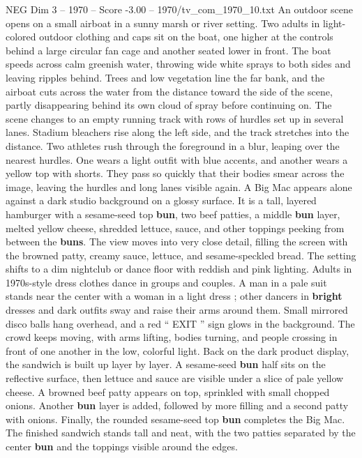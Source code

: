 \begin{textsample}{NEG Dim 3 – 1970 – Score -3.00 – 1970/tv\_com\_1970\_10.txt}  \label{ex:f3_neg_062}
An outdoor scene opens on a small airboat in a sunny marsh or river setting.
Two adults in light-colored outdoor clothing and caps sit on the boat, one higher at the controls behind a large circular fan cage and another seated lower in front.
The boat speeds across calm greenish water, throwing wide white sprays to both sides and leaving ripples behind.
Trees and low vegetation line the far bank, and the airboat cuts across the water from the distance toward the side of the scene, partly disappearing behind its own cloud of spray before continuing on.
The scene changes to an empty running track with rows of hurdles set up in several lanes.
Stadium bleachers rise along the left side, and the track stretches into the distance.
Two athletes rush through the foreground in a blur, leaping over the nearest hurdles.
One wears a light outfit with blue accents, and another wears a yellow top with shorts.
They pass so quickly that their bodies smear across the image, leaving the hurdles and long lanes visible again.
A Big Mac appears alone against a dark studio background on a glossy surface.
It is a tall, layered hamburger with a sesame-seed top \textbf{bun}, two beef patties, a middle \textbf{bun} layer, melted yellow cheese, shredded lettuce, sauce, and other toppings peeking from between the \textbf{buns}.
The view moves into very close detail, filling the screen with the browned patty, creamy sauce, lettuce, and sesame-speckled bread.
The setting shifts to a dim nightclub or dance floor with reddish and pink lighting.
Adults in 1970s-style dress clothes dance in groups and couples.
A man in a pale suit stands near the center with a woman in a light dress ; other dancers in \textbf{bright} dresses and dark outfits sway and raise their arms around them.
Small mirrored disco balls hang overhead, and a red “ EXIT ” sign glows in the background.
The crowd keeps moving, with arms lifting, bodies turning, and people crossing in front of one another in the low, colorful light.
Back on the dark product display, the sandwich is built up layer by layer.
A sesame-seed \textbf{bun} half sits on the reflective surface, then lettuce and sauce are visible under a slice of pale yellow cheese.
A browned beef patty appears on top, sprinkled with small chopped onions.
Another \textbf{bun} layer is added, followed by more filling and a second patty with onions.
Finally, the rounded sesame-seed top \textbf{bun} completes the Big Mac.
The finished sandwich stands tall and neat, with the two patties separated by the center \textbf{bun} and the toppings visible around the edges.

\end{textsample}
